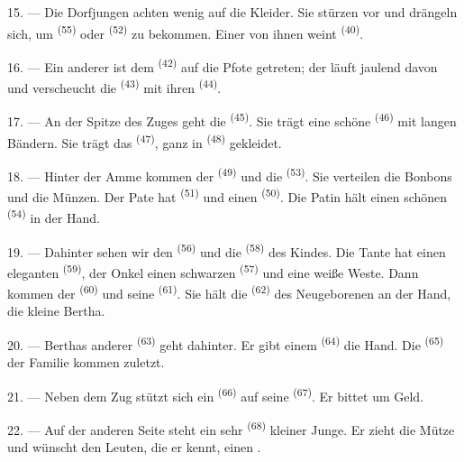 15. --- Die Dorfjungen achten wenig auf die Kleider. Sie stürzen vor und drängeln
sich, um  \textsuperscript{(55)} oder 
\textsuperscript{(52)} zu bekommen. Einer von ihnen weint \textsuperscript{(40)}.

16. --- Ein anderer ist dem  \textsuperscript{(42)} auf die Pfote
getreten; der läuft jaulend davon und verscheucht die 
\textsuperscript{(43)} mit ihren  \textsuperscript{(44)}.

\VUsaut{5.0mm}
\VUsaut{4.0mm}

17. --- An der Spitze des Zuges geht die  \textsuperscript{(45)}. Sie
trägt eine schöne  \textsuperscript{(46)} mit langen Bändern. Sie
trägt das  \textsuperscript{(47)}, ganz in 
\textsuperscript{(48)} gekleidet.

18. --- Hinter der Amme kommen der  \textsuperscript{(49)} und die
 \textsuperscript{(53)}. Sie verteilen die Bonbons und die Münzen. Der
Pate hat  \textsuperscript{(51)} und einen 
\textsuperscript{(50)}. Die Patin hält einen schönen 
\textsuperscript{(54)} in der Hand.

19. --- Dahinter sehen wir den  \textsuperscript{(56)} und die
 \textsuperscript{(58)} des Kindes. Die Tante hat einen eleganten
 \textsuperscript{(59)}, der Onkel einen schwarzen 
\textsuperscript{(57)} und eine weiße Weste. Dann kommen der 
\textsuperscript{(60)} und seine  \textsuperscript{(61)}. Sie hält die
 \textsuperscript{(62)} des Neugeborenen an der Hand, die kleine
Bertha.

20. --- Berthas anderer  \textsuperscript{(63)} geht dahinter. Er gibt
einem  \textsuperscript{(64)} die Hand. Die 
\textsuperscript{(65)} der Familie kommen zuletzt.

\VUsaut{4.6mm}
\VUsaut{3.4mm}

21. --- Neben dem Zug stützt sich ein  \textsuperscript{(66)} auf
seine  \textsuperscript{(67)}. Er bittet um Geld.

22. --- Auf der anderen Seite steht ein sehr 
\textsuperscript{(68)} kleiner Junge. Er zieht die Mütze und wünscht den Leuten,
die er kennt, einen .

